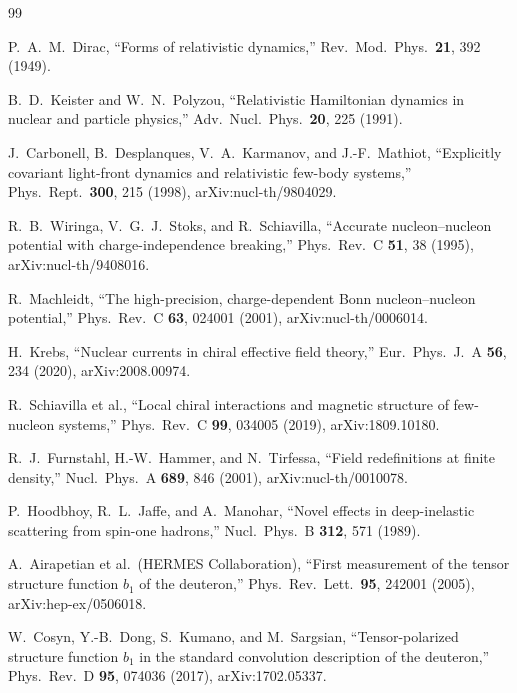\documentclass[11pt]{article}
\begin{document}
\footnotesize
\begin{thebibliography}{99}

P.~A.~M.~Dirac,
``Forms of relativistic dynamics,''
Rev.\ Mod.\ Phys.\ \textbf{21}, 392 (1949).

B.~D.~Keister and W.~N.~Polyzou,
``Relativistic Hamiltonian dynamics in nuclear and particle physics,''
Adv.\ Nucl.\ Phys.\ \textbf{20}, 225 (1991).

J.~Carbonell, B.~Desplanques, V.~A.~Karmanov, and J.-F.~Mathiot,
``Explicitly covariant light-front dynamics and relativistic few-body systems,''
Phys.\ Rept.\ \textbf{300}, 215 (1998), arXiv:nucl-th/9804029.

R.~B.~Wiringa, V.~G.~J.~Stoks, and R.~Schiavilla,
``Accurate nucleon--nucleon potential with charge-independence breaking,''
Phys.\ Rev.\ C \textbf{51}, 38 (1995), arXiv:nucl-th/9408016.

R.~Machleidt,
``The high-precision, charge-dependent Bonn nucleon--nucleon potential,''
Phys.\ Rev.\ C \textbf{63}, 024001 (2001), arXiv:nucl-th/0006014.

H.~Krebs,
``Nuclear currents in chiral effective field theory,''
Eur.\ Phys.\ J.\ A \textbf{56}, 234 (2020), arXiv:2008.00974.

R.~Schiavilla et al.,
``Local chiral interactions and magnetic structure of few-nucleon systems,''
Phys.\ Rev.\ C \textbf{99}, 034005 (2019), arXiv:1809.10180.

R.~J.~Furnstahl, H.-W.~Hammer, and N.~Tirfessa,
``Field redefinitions at finite density,''
Nucl.\ Phys.\ A \textbf{689}, 846 (2001), arXiv:nucl-th/0010078.

P.~Hoodbhoy, R.~L.~Jaffe, and A.~Manohar,
``Novel effects in deep-inelastic scattering from spin-one hadrons,''
Nucl.\ Phys.\ B \textbf{312}, 571 (1989).

A.~Airapetian et al.\ (HERMES Collaboration),
``First measurement of the tensor structure function \(b_1\) of the deuteron,''
Phys.\ Rev.\ Lett.\ \textbf{95}, 242001 (2005), arXiv:hep-ex/0506018.

W.~Cosyn, Y.-B.~Dong, S.~Kumano, and M.~Sargsian,
``Tensor-polarized structure function \(b_1\) in the standard convolution description of the deuteron,''
Phys.\ Rev.\ D \textbf{95}, 074036 (2017), arXiv:1702.05337.


\end{thebibliography}
\end{document}

